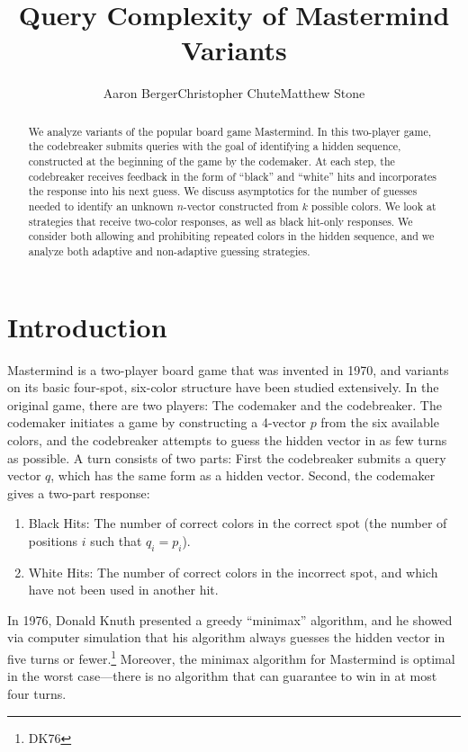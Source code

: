 \documentclass[12pt, a4paper]{article}
\author{Aaron Berger\qquad Christopher Chute\qquad Matthew Stone}
\title{Query Complexity of Mastermind Variants}
\begin{document}
\maketitle

\begin{abstract}
We analyze variants of the popular board game Mastermind. In this two-player game,
the codebreaker submits queries with the goal of identifying a hidden
sequence, constructed at the beginning of the game by the codemaker. At each step,
the codebreaker receives feedback in the form of ``black'' and ``white'' hits
and incorporates the response into his next guess. We discuss asymptotics for the
number of guesses needed to identify an unknown $n$-vector constructed from $k$
possible colors. We look at strategies that receive two-color responses, as well as
black hit-only responses. We consider both allowing and prohibiting repeated
colors in the hidden sequence, and we analyze both adaptive and non-adaptive guessing
strategies.
\end{abstract}

\section{Introduction}
Mastermind is a two-player board game that was invented in 1970, and variants on its
basic four-spot, six-color structure have been studied extensively.
In the original game, there are two players: The codemaker and the codebreaker.
The codemaker initiates a game by constructing a 4-vector $p$ from the six available
colors, and the codebreaker attempts to guess the hidden vector in as few turns as
possible. A turn consists of two parts: First the codebreaker submits a query vector
$q$, which has the same form as a hidden vector. Second, the codemaker gives a
two-part response:
	\begin{enumerate}[label=\arabic*.]
	\item Black Hits: The number of correct colors in the correct spot
	(the number of positions $i$ such that $q_i=p_i$).
	\item White Hits: The number of correct colors in the incorrect spot, and which
	have not been used in another hit.
	\end{enumerate}
In 1976, Donald Knuth presented a greedy ``minimax'' algorithm, and he showed via
computer simulation that his algorithm always guesses the hidden vector in five turns
or fewer.\footnote{DK76} Moreover, the minimax algorithm for Mastermind is optimal in
the worst case---there is no algorithm that can guarantee to win in at most four turns.
\end{document}
